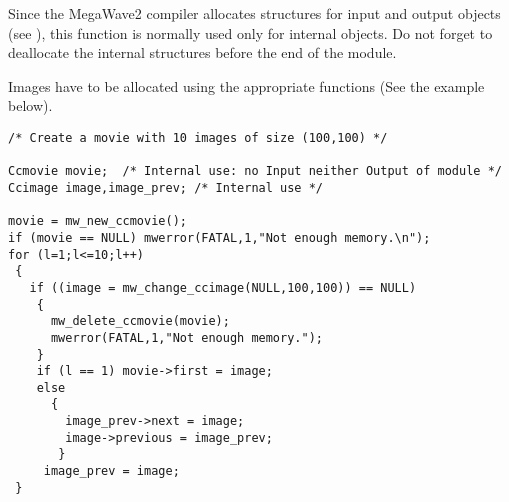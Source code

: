 Since the MegaWave2 compiler allocates structures for input and output 
objects (see \volI), this function is normally used only for internal objects.
Do not forget to deallocate the internal structures before the end
of the module.

Images have to be allocated using the appropriate functions (See the example
below).

\Next
\Example
\begin{verbatim}
/* Create a movie with 10 images of size (100,100) */

Ccmovie movie;  /* Internal use: no Input neither Output of module */
Ccimage image,image_prev; /* Internal use */

movie = mw_new_ccmovie();
if (movie == NULL) mwerror(FATAL,1,"Not enough memory.\n");
for (l=1;l<=10;l++)
 {
   if ((image = mw_change_ccimage(NULL,100,100)) == NULL)
    {
      mw_delete_ccmovie(movie);
      mwerror(FATAL,1,"Not enough memory.");
    }
    if (l == 1) movie->first = image;
    else
      {
        image_prev->next = image;
        image->previous = image_prev;
       }
     image_prev = image;
 }
\end{verbatim}
\newpage %

